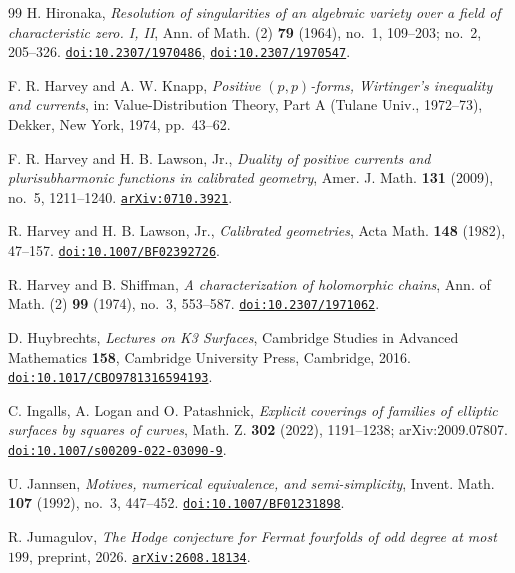 \begin{thebibliography}{99}
H. Hironaka,
\emph{Resolution of singularities of an algebraic variety over a field of
characteristic zero. I, II},
Ann. of Math. (2) \textbf{79} (1964), no.~1, 109--203; no.~2, 205--326.
\href{https://doi.org/10.2307/1970486}{\texttt{doi:10.2307/1970486}},
\href{https://doi.org/10.2307/1970547}{\texttt{doi:10.2307/1970547}}.

F. R. Harvey and A. W. Knapp,
\emph{Positive $(p,p)$-forms, Wirtinger's inequality and currents},
in: Value-Distribution Theory, Part A (Tulane Univ., 1972--73),
Dekker, New York, 1974, pp.~43--62.

F. R. Harvey and H. B. Lawson, Jr.,
\emph{Duality of positive currents and plurisubharmonic functions in
calibrated geometry},
Amer. J. Math. \textbf{131} (2009), no.~5, 1211--1240.
\href{https://arxiv.org/abs/0710.3921}{\texttt{arXiv:0710.3921}}.

R. Harvey and H. B. Lawson, Jr.,
\emph{Calibrated geometries},
Acta Math. \textbf{148} (1982), 47--157.
\href{https://doi.org/10.1007/BF02392726}{\texttt{doi:10.1007/BF02392726}}.

R. Harvey and B. Shiffman,
\emph{A characterization of holomorphic chains},
Ann. of Math. (2) \textbf{99} (1974), no.~3, 553--587.
\href{https://doi.org/10.2307/1971062}{\texttt{doi:10.2307/1971062}}.

D. Huybrechts,
\emph{Lectures on K3 Surfaces},
Cambridge Studies in Advanced Mathematics \textbf{158},
Cambridge University Press, Cambridge, 2016.
\href{https://doi.org/10.1017/CBO9781316594193}{\texttt{doi:10.1017/CBO9781316594193}}.

C. Ingalls, A. Logan and O. Patashnick,
\emph{Explicit coverings of families of elliptic surfaces by squares of
curves},
Math. Z. \textbf{302} (2022), 1191--1238; arXiv:2009.07807.
\href{https://doi.org/10.1007/s00209-022-03090-9}{\texttt{doi:10.1007/s00209-022-03090-9}}.

U. Jannsen,
\emph{Motives, numerical equivalence, and semi-simplicity},
Invent. Math. \textbf{107} (1992), no.~3, 447--452.
\href{https://doi.org/10.1007/BF01231898}{\texttt{doi:10.1007/BF01231898}}.

R. Jumagulov,
\emph{The Hodge conjecture for Fermat fourfolds of odd degree at most
$199$},
preprint, 2026.
\href{https://arxiv.org/abs/2608.18134}{\texttt{arXiv:2608.18134}}.


\end{thebibliography}
